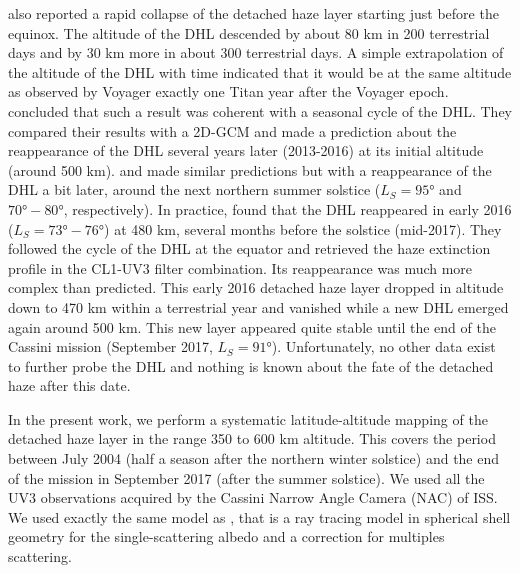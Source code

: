\cite{West2011} also reported a rapid collapse of the detached haze layer starting just before the equinox. The altitude of
the DHL descended by about 80 km in 200 terrestrial days and by 30 km more in about 300 terrestrial days. A simple
extrapolation of the altitude of the DHL with time indicated that it would be at the same altitude as observed by Voyager
exactly one Titan year after the Voyager epoch. \cite{West2011} concluded that such a result was coherent with a seasonal
cycle of the DHL.  They compared their results with a 2D-GCM \citep{Rannou2002} and made a prediction about the reappearance of the
DHL several years later (2013-2016) at its initial altitude (around 500 km). \cite{Lebonnois2012} and \cite{Larson2015} made
similar predictions but with a reappearance of the DHL a bit later, around the next northern summer solstice ($L_S=\ang{95}$
and $\ang{70}-\ang{80}$, respectively). In practice, \cite{West2018} found that the DHL reappeared in early 2016
($L_S=\ang{73}-\ang{76}$) at 480 km, several months before the solstice (mid-2017). They followed the cycle of the DHL at the equator
and retrieved the haze extinction profile in the CL1-UV3 filter combination.
Its reappearance was much more complex than predicted. This early 2016 detached haze layer
dropped in altitude down to 470 km within a terrestrial year and vanished while a new DHL emerged again around 500 km. This
new layer appeared quite stable until the end of the Cassini mission (September 2017, $L_S=\ang{91}$). Unfortunately, no other
data exist to further probe the DHL and nothing is known about the fate of the detached haze after this date.

\medskip

In the present work, we perform a systematic latitude-altitude mapping of the detached haze layer in the range 350 to 600 km altitude.
This covers the period between July 2004 (half a season after the northern winter solstice) and the end of
the mission in September 2017 (after the summer solstice).
We used all the UV3 observations acquired by the Cassini Narrow Angle Camera (NAC) of ISS.
We used exactly the same model as \cite{West2018}, that is a ray tracing model in spherical shell geometry for the single-scattering albedo
and a correction for multiples scattering.

